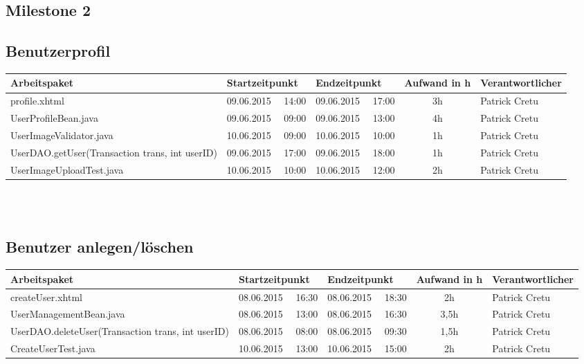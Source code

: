 \begin{landscape}
	\section{Milestone 2}
	
	\subsection{Benutzerprofil}
	\begin{tabular}{|p{10.3cm}|p{3.2cm}|p{3.2cm}|c|p{3.5cm}|}
		\hline  \textbf{Arbeitspaket} & \textbf{Startzeitpunkt} & \textbf{Endzeitpunkt} & \textbf{Aufwand in h} & \textbf{Verantwortlicher} \\ 
		\hline   profile.xhtml                                         & 09.06.2015 \ \ 14:00        & 09.06.2015 \ \ 17:00        &  3h                 & Patrick Cretu\\ 
		\hline   UserProfileBean.java                                  & 09.06.2015 \ \ 09:00        & 09.06.2015 \ \ 13:00        &  4h                 & Patrick Cretu\\ 
		\hline   UserImageValidator.java                               & 10.06.2015 \ \ 09:00        & 10.06.2015 \ \ 10:00        &  1h                 & Patrick Cretu\\ 
		\hline   UserDAO.getUser(Transaction trans, int userID)        & 09.06.2015 \ \ 17:00        & 09.06.2015 \ \ 18:00        &  1h                 & Patrick Cretu\\  
		\hline   UserImageUploadTest.java & 10.06.2015 \ \ 10:00 & 10.06.2015 \ \ 12:00 & 2h & Patrick Cretu\\
		\hline 
	\end{tabular} \ \\
	\ \\
	
	\subsection{Benutzer anlegen/löschen}
	\begin{tabular}{|p{10.3cm}|p{3.2cm}|p{3.2cm}|c|p{3.5cm}|}
		\hline  \textbf{Arbeitspaket} & \textbf{Startzeitpunkt} & \textbf{Endzeitpunkt} & \textbf{Aufwand in h} & \textbf{Verantwortlicher} \\ 
		\hline   createUser.xhtml                                      & 08.06.2015 \ \ 16:30        & 08.06.2015 \ \ 18:30        &  2h                 & Patrick Cretu\\ 
		\hline   UserManagementBean.java                               & 08.06.2015 \ \ 13:00        & 08.06.2015 \ \ 16:30        &  3,5h               & Patrick Cretu\\ 
		\hline   UserDAO.deleteUser(Transaction trans, int userID)     & 08.06.2015 \ \ 08:00        & 08.06.2015 \ \ 09:30        &  1,5h               & Patrick Cretu\\ 
		\hline   CreateUserTest.java & 10.06.2015 \ \ 13:00 & 10.06.2015 \ \ 15:00 & 2h & Patrick Cretu\\
		\hline 
	\end{tabular} \ \\
	\ \\
	

\end{landscape}

